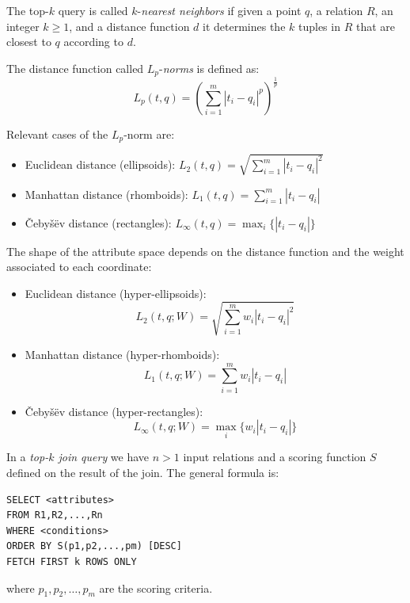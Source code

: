 \begin{definition}
    The top-$k$ query is called $k$-\emph{nearest neighbors} if given a point $q$, a relation $R$, an integer $k \geq 1$, and a distance function $d$ it determines the $k$ tuples 
    in $R$ that are closest to $q$ according to $d$. 

    The distance function called $L_p$-\emph{norms} is defined as:
    \[L_p(t,q)=\left(\sum_{i=1}^{m}{\left\lvert t_i-q_i \right\rvert^{p}}\right)^{\frac{1}{p}}\]
\end{definition}
Relevant cases of the $L_p$-norm are: 
\begin{itemize}
    \item Euclidean distance (ellipsoids): $L_2(t,q)=\sqrt{\sum_{i=1}^{m}{\left\lvert t_i-q_i \right\rvert^{2}}}$
    \item Manhattan distance (rhomboids): $L_1(t,q)=\sum_{i=1}^{m}{\left\lvert t_i-q_i \right\rvert}$
    \item Čebyšëv distance (rectangles): $L_{\infty}(t,q)=\max_{i}\{\left\lvert t_i-q_i\right\rvert\}$
\end{itemize}
The shape of the attribute space depends on the distance function and the weight associated to each coordinate: 
\begin{itemize}
    \item Euclidean distance (hyper-ellipsoids):
        \[L_2(t,q;W)=\sqrt{\sum_{i=1}^{m}{w_i\left\lvert t_i-q_i \right\rvert^{2}}}\]
    \item Manhattan distance (hyper-rhomboids): 
        \[L_1(t,q;W)=\sum_{i=1}^{m}{w_i\left\lvert t_i-q_i \right\rvert}\]
    \item Čebyšëv distance (hyper-rectangles): 
        \[L_{\infty}(t,q;W)=\max_{i}\{w_i \left\lvert t_i-q_i\right\rvert\}\]
\end{itemize}
\begin{definition}
    In a \emph{top-$k$ join query} we have $n > 1$ input relations and a scoring function $S$ defined on the result of the join. The general formula is: 
    \begin{lstlisting}[style=SQL]
SELECT <attributes>
FROM R1,R2,...,Rn
WHERE <conditions>
ORDER BY S(p1,p2,...,pm) [DESC]
FETCH FIRST k ROWS ONLY             
    \end{lstlisting}
    where $p_1,p_2,\dots,p_m$ are the scoring criteria. 
\end{definition}

